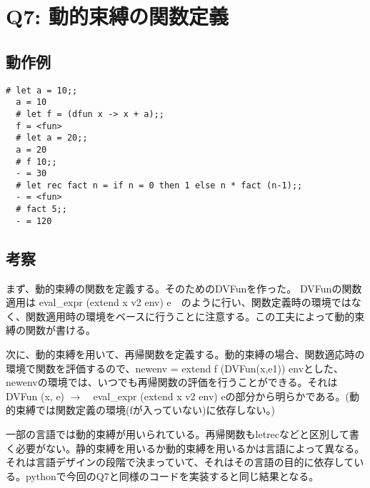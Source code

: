 \documentclass[uplatex,12pt]{jsarticle}
\begin{document}
\section{Q7: 動的束縛の関数定義}
\subsection{動作例}
\begin{lstlisting}[caption=動作例]
  # let a = 10;;
  a = 10
  # let f = (dfun x -> x + a);;
  f = <fun>
  # let a = 20;;
  a = 20
  # f 10;;
  - = 30
  # let rec fact n = if n = 0 then 1 else n * fact (n-1);;
  - = <fun>
  # fact 5;;
  - = 120
\end{lstlisting}
\subsection{考察}

まず、動的束縛の関数を定義する。そのためのDVFunを作った。
DVFunの関数適用は eval\_expr (extend x v2 env) e　のように行い、関数定義時の環境ではなく、関数適用時の環境をベースに行うことに注意する。この工夫によって動的束縛の関数が書ける。

次に、動的束縛を用いて、再帰関数を定義する。動的束縛の場合、関数適応時の環境で関数を評価するので、newenv = extend f (DVFun(x,e1)) envとした、newenvの環境では、いつでも再帰関数の評価を行うことができる。それは DVFun (x, e) $\rightarrow$　eval\_expr (extend x v2 env) eの部分から明らかである。(動的束縛では関数定義の環境(fが入っていない)に依存しない。)

一部の言語では動的束縛が用いられている。再帰関数もletrecなどと区別して書く必要がない。静的束縛を用いるか動的束縛を用いるかは言語によって異なる。それは言語デザインの段階で決まっていて、それはその言語の目的に依存している。pythonで今回のQ7と同様のコードを実装すると同じ結果となる。
\end{document}
